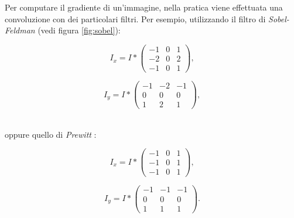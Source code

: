 Per computare il gradiente di un'immagine, nella pratica viene effettuata una convoluzione con dei particolari filtri. Per esempio, utilizzando il filtro di \textit{Sobel-Feldman} (vedi figura \ref{fig:sobel}):\\
\vspace*{15pt}
\hspace*{-8pt}
\noindent\begin{minipage}{.5\linewidth}
	\begin{equation}
		I_{x} = I * 
			\begin{pmatrix}
				-1 & 0 & 1 \\
				-2 & 0 & 2\\
				-1 & 0 & 1
			\end{pmatrix},
		\label{eq:sobel-x}
	\end{equation}
\end{minipage}%
\hspace*{-10pt}
\begin{minipage}{.5\linewidth}
	\begin{equation}
		I_{y} = I * 
			\begin{pmatrix}
				-1 & -2 & -1 \\
				0 & 0 & 0\\
				1 & 2 & 1
			\end{pmatrix},
		\label{eq:sobel-y}
	\end{equation}
\end{minipage}\\
oppure quello di \textit{Prewitt} \cite{bib:prewitt}:\\
\noindent\begin{minipage}{.5\linewidth}
	\begin{equation}
		I_{x} = I * 
			\begin{pmatrix}
				-1 & 0 & 1 \\
				-1 & 0 & 1\\
				-1 & 0 & 1
			\end{pmatrix},
		\label{eq:prewitt-x}
	\end{equation}
\end{minipage}%
\hspace*{-10pt}
\begin{minipage}{.5\linewidth}
	\begin{equation}
		I_{y} = I * 
			\begin{pmatrix}
				-1 & -1 & -1 \\
				0 & 0 & 0\\
				1 & 1 & 1
			\end{pmatrix}.
		\label{eq:prewitt-y}
	\end{equation}
\end{minipage}

